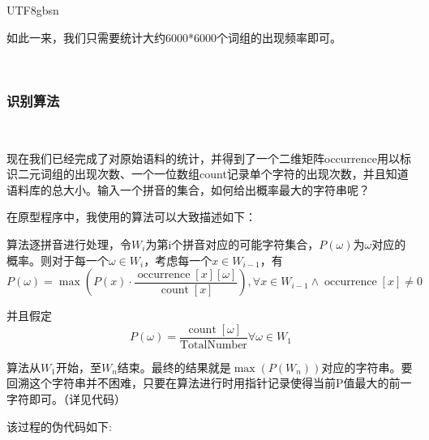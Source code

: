 \documentclass{article}
\newcommand{\tmop}[1]{\ensuremath{\operatorname{#1}}}
\newenvironment{tmindent}{\begin{tmparmod}{1.5em}{0pt}{0pt}}{\end{tmparmod}}
\newenvironment{tmparmod}[3]{\begin{list}{}{\setlength{\topsep}{0pt}\setlength{\leftmargin}{#1}\setlength{\rightmargin}{#2}\setlength{\parindent}{#3}\setlength{\listparindent}{\parindent}\setlength{\itemindent}{\parindent}\setlength{\parsep}{\parskip}} \item[]}{\end{list}}
\begin{document}
\begin{CJK*}{UTF8}{gbsn}
{{\begin{tmindent}
  
  如此一来，我们只需要统计大约6000*6000个词组的出现频率即可。
  
  \ 
\end{tmindent}}}

\subsubsection{识别算法}

\begin{tmindent}
  \
  
  现在我们已经完成了对原始语料的统计，并得到了一个二维矩阵occurrence用以标识二元词组的出现次数、一个一位数组count记录单个字符的出现次数，并且知道语料库的总大小。输入一个拼音的集合，如何给出概率最大的字符串呢？
  
  在原型程序中，我使用的算法可以大致描述如下：
  
  算法逐拼音进行处理，令$W_i$为第i个拼音对应的可能字符集合，$P
  (\omega)$为$\omega$对应的概率。则对于每一个$\omega \in
  W_i$，考虑每一个$x \in W_{i - 1}$，有
  \[ P (\omega) = \max \left( P (x) \cdot \frac{\tmop{occurrence} [x]
     [\omega]}{\tmop{count} [x]} \right), \forall x \in W_{i - 1} \wedge
     \tmop{occurrence} [x] \neq 0 \]
  
  
  并且假定
  \[ P (\omega) = \frac{\tmop{count} [\omega]}{\tmop{TotalNumber}} \forall
     \omega \in W_1 \]
  
  
  算法从$W_1$开始，至$W_n$结束。最终的结果就是$\max (P
  (W_n))$对应的字符串。要回溯这个字符串并不困难，只要在算法进行时用指针记录使得当前P值最大的前一字符即可。（详见代码）
  
  该过程的伪代码如下:
  
  {}
\end{tmindent}
\end{CJK*}
\end{document}
